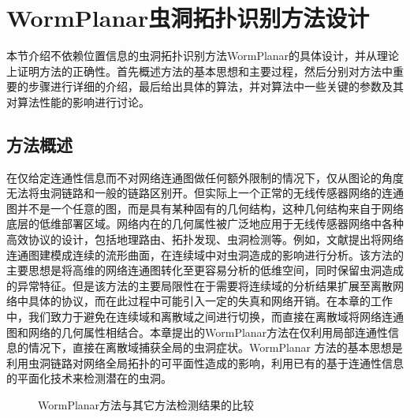 \section{WormPlanar虫洞拓扑识别方法设计}
本节介绍不依赖位置信息的虫洞拓扑识别方法WormPlanar的具体设计，并从理论上证明方法的正确性。首先概述方法的基本思想和主要过程，然后分别对方法中重要的步骤进行详细的介绍，最后给出具体的算法，并对算法中一些关键的参数及其对算法性能的影响进行讨论。
\subsection{方法概述}
在仅给定连通性信息而不对网络连通图做任何额外限制的情况下，仅从图论的角度无法将虫洞链路和一般的链路区别开。但实际上一个正常的无线传感器网络的连通图并不是一个任意的图，而是具有某种固有的几何结构，这种几何结构来自于网络底层的低维部署区域。网络内在的几何属性被广泛地应用于无线传感器网络中各种高效协议的设计，包括地理路由、拓扑发现、虫洞检测等。例如，文献提出将网络连通图建模成连续的流形曲面，在连续域中对虫洞造成的影响进行分析。该方法的主要思想是将高维的网络连通图转化至更容易分析的低维空间，同时保留虫洞造成的异常特征。但是该方法的主要局限性在于需要将连续域的分析结果扩展至离散网络中具体的协议，而在此过程中可能引入一定的失真和网络开销。在本章的工作中，我们致力于避免在连续域和离散域之间进行切换，而直接在离散域将网络连通图和网络的几何属性相结合。本章提出的WormPlanar方法在仅利用局部连通性信息的情况下，直接在离散域捕获全局的虫洞症状。WormPlanar 方法的基本思想是利用虫洞链路对网络全局拓扑的可平面性造成的影响，利用已有的基于连通性信息的平面化技术来检测潜在的虫洞。
\begin{figure}[t]
  \centering
  \hspace{0.5em}%
  \hspace{0.5em}%
  \hspace{0.5em}%
  \hspace{0.5em}%
  \caption{WormPlanar方法与其它方法检测结果的比较}
  \label{fig:403}
\end{figure}

